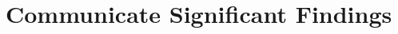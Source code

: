 \documentclass[9pt,twocolumn,twoside]{gsag3jnl}
\begin{document}





\section*{Communicate Significant Findings}
\end{document}
